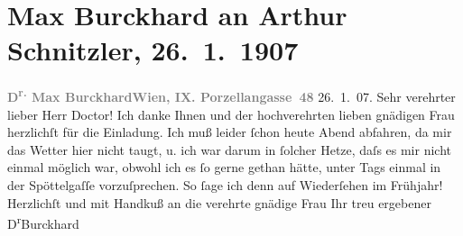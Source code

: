 

               \section[Max Burckhard an Arthur Schnitzler, 26. 1. 1907]{ Max Burckhard an Arthur Schnitzler, 26. 1. 1907}\nopagebreak{}\rehead{ }\begin{ledgroupsized}[t]{13cm}\normalsize\beginnumbering{} \toendnotes[C]{\smallbreak\pagebreak[2]} 
\toendnotes[C]{\smallbreak}\pstart
           \noindent{}{\pb}\textcolor{gray}{\textbf{D\textsuperscript{r.} Max Burckhard}}\hfill \textcolor{gray}{\textbf{Wien, IX. Porzellangasse 48}}{ }26. 1. 07.\pend
           \pstart
           \raggedleft{}\textcolor{gray}{\textbf{}}\hspace*{3.5em}\pend
           \pstart{}Sehr verehrter lieber Herr Doctor!\pend\pstart
           Ich danke Ihnen und der hochverehrten lieben gnädigen Frau herzlichſt für die Einladung. Ich
                    muß leider ſchon heute Abend abfahren, da mir das Wetter hier nicht taugt, u.
                    ich war darum in ſolcher Hetze, daſs es mir nicht einmal möglich war, obwohl ich
                    es ſo gerne gethan hätte, unter Tags einmal in der Spöttelgaſſe vorzuſprechen. So ſage ich denn auf Wiederſehen im
                    Frühjahr! Herzlichſt und mit Handkuß an die verehrte gnädige Frau Ihr treu ergebener\pend
           \pstart \spacefill\mbox{D\textsuperscript{r}Burckhard}\pend{}\endnumbering{}\end{ledgroupsized}  \newcommand{\dateiname}{L01654}\newcommand{\titel}{Max Burckhard an Arthur Schnitzler, 26. 1. 1907}\newcommand{\editorInnen}{Martin Anton Müller und Gerd-Hermann Susen}
      